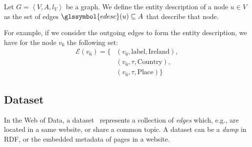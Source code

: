 %

\begin{definition}
Let $G = \left\langle V, A, l_V \right\rangle$ be a graph. We define the entity description of a node $u \in V$ as the set of edges $\glssymbol{edesc}(u) \subseteq A$ that describe that node.
\label{chap2:semi-structured-data:def:entity-description}
\end{definition}

For example, if we consider the outgoing edges to form the entity description, we have for the node $v_6$ the following set:
$$
\begin{aligned}
\mathcal{E}\left( v_6 \right) = \{ & \left( v_6, \text{label}, \text{Ireland} \right),\\
& \left( v_6, \tau, \text{Country} \right),\\
& \left( v_6, \tau, \text{Place} \right) \}
\end{aligned}
$$

\subsection{Dataset}
\label{sec:ssd:dataset}

In the Web of Data, a dataset~\cite{alexander:2009:dld} represents a collection of \emph{edges} which, e.g., are located in a same website, or share a common topic. A dataset can be a \emph{dump} in RDF, or the embedded metadata of pages in a website.

